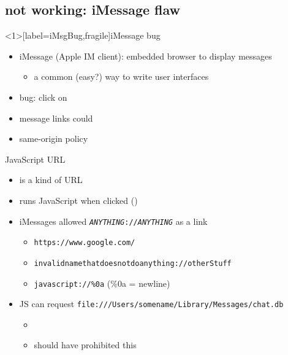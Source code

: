 \subsection{not working: iMessage flaw}

\begin{frame}<1>[label=iMsgBug,fragile]{iMessage bug}
    \begin{itemize}
        \item iMessage (Apple IM client): embedded browser to display messages
            \begin{itemize}
            \item a common (easy?) way to write user interfaces
            \end{itemize}
        \item bug: click on 
        \vspace{.5cm}
        \item<2-> message links could 
        \item<2-> same-origin policy 
    \end{itemize}

\end{frame}


\begin{frame}{JavaScript URL}
    \begin{itemize}
        \item {} is a kind of URL
        \item runs JavaScript when clicked ()
        \item iMessages allowed \texttt{\textit{ANYTHING}://\textit{ANYTHING}} as a link
            \begin{itemize}
            \item \texttt{https://www.google.com/}
            \item \texttt{invalidnamethatdoesnotdoanything://otherStuff}
            \item \texttt{javascript://\%0a} (\%0a = newline)
            \end{itemize}
        \item JS can request \fontsize{11}{12}\texttt{file:///Users/somename/Library/Messages/chat.db}
            \begin{itemize}
                \item {}
                \item should have prohibited this
            \end{itemize}
    \end{itemize}
\end{frame}

